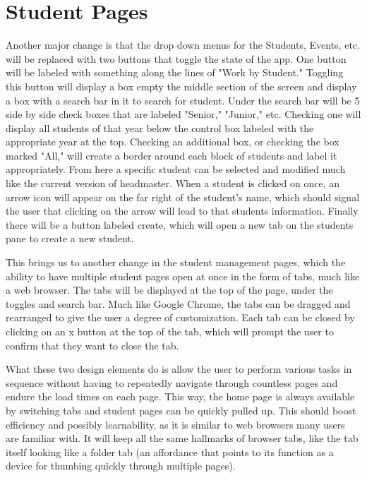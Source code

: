 \documentclass{article}
\begin{document}
\section{Student Pages}
Another major change is that the drop down menus for the Students, Events, etc.  will be replaced with two buttons that toggle the state of the app. One button will be labeled with something along the lines of "Work by Student." Toggling this button will display a box empty the middle section of the screen and display a box with a search bar in it to search for student. Under the search bar will be 5 side by side check boxes that are labeled "Senior," "Junior," etc. Checking one will display all students of that year below the control box labeled with the appropriate year at the top. Checking an additional box, or checking the box marked "All," will create a border around each block of students and label it appropriately. From here a specific student can be selected and modified much like the current version of headmaster. When a student is clicked on once, an arrow icon will appear on the far right of the student's name, which should signal the user that clicking on the arrow will lead to that students information. Finally there will be a button labeled create, which will open a new tab on the students pane to create a new student. 

This brings us to another change in the student management pages, which the ability to have multiple student pages open at once in the form of tabs, much like a web browser. The tabs will be displayed at the top of the page, under the toggles and search bar. Much like Google Chrome, the tabs can be dragged and rearranged to give the user a degree of customization. Each tab can be closed by clicking on an x button at the top of the tab, which will prompt the user to confirm that they want to close the tab.

What these two design elements do is allow the user to perform various tasks in sequence without having to repeatedly navigate through countless pages and endure the load times on each page. This way, the home page is always available by switching tabs and student pages can be quickly pulled up. This should boost efficiency and possibly learnability, as it is similar to web browsers many users are familiar with. It will keep all the same hallmarks of browser tabs, like the tab itself looking like a folder tab (an affordance that points to its function as a device for thumbing quickly through multiple pages). 
\end{document}
